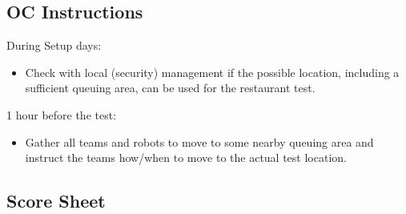 \subsection*{OC Instructions}
During Setup days:
\begin{itemize}[nosep]
	\item Check with local (security) management if the possible location, including a sufficient queuing area, can be used for the restaurant test.
\end{itemize}
1 hour before the test:
\begin{itemize}[nosep]
	\item Gather all teams and robots to move to some nearby queuing area and instruct the teams how/when to move to the actual test location.
\end{itemize}


\subsection*{Score Sheet}



